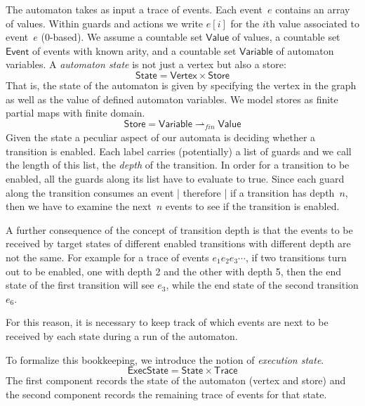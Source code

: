 \documentclass[10pt]{llncs} %
\newcommand{\pmap}{\rightharpoonup}
\newcommand{\set}[1]{\ensuremath{\mathsf{#1}}}
\begin{document}
The automaton takes as input a trace of events.
Each event~$e$ contains an array of values.
Within guards and actions we write $e[i]$ for the $i$th value associated to event~$e$ (0-based).
We assume a countable set \set{Value} of values, a countable set \set{Event} of events with known arity,
and a countable set $\set{Variable}$ of automaton variables.
A {\em  automaton state} is not just a vertex but also a store: 
\[
\set{State} = \set{Vertex}\times\set{Store}
\]
That is, the state of the automaton is
given by specifying the vertex in the graph as well as the value of defined automaton variables.
%
We model stores as finite partial maps with finite domain.
\[
\set{Store} = \set{Variable} \pmap_{\mathit{fin}} \set{Value}
\]
%
Given the state a peculiar aspect of our automata is deciding whether a transition is enabled.
Each label carries (potentially) a list of guards and 
we call the length of this list, the \emph{depth} of the transition.
%
In order for a transition to be enabled, all the guards along its
list have to evaluate to true. Since each guard along the transition consumes
an event |  therefore | if a transition has depth~$n$, then we have to examine the next~$n$ events to see if the transition is enabled.

A further consequence of the concept of transition depth is that the events to be received by  target states 
of different enabled transitions with different depth are
not the same.  For example for a trace of events $e_1 e_2 e_3\cdots$, if two transitions
turn out to be enabled, one with depth 2 and the other with depth 5,
then the end state of the first transition will see $e_3$, while the end state of the second transition $e_6$. 


For this reason, it is necessary to keep track
of which events are next to be received by each state during a run of
the automaton.

To formalize this bookkeeping, we introduce the notion of
\emph{execution state}. 
\newcommand{\World}{ExecState}
\[
\set{\World} = \set{State}\times\set{Trace}
\]
The first component records the state of the automaton (vertex
and store) and the second component records the remaining trace of
events for that state.
\end{document}
